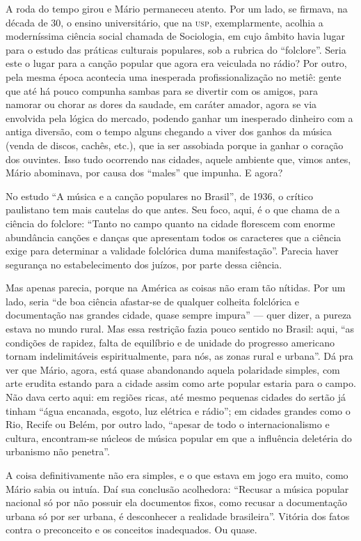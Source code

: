 A roda do tempo girou e Mário permaneceu atento. Por um lado, se
firmava, na década de 30, o ensino universitário, que na \textsc{usp},
exemplarmente, acolhia a moderníssima ciência social chamada de
Sociologia, em cujo âmbito havia lugar para o estudo das práticas
culturais populares, sob a rubrica do ``folclore''. Seria este o lugar
para a canção popular que agora era veiculada no rádio? Por outro, pela
mesma época acontecia uma inesperada profissionalização no metiê: gente
que até há pouco compunha sambas para se divertir com os amigos, para
namorar ou chorar as dores da saudade, em caráter amador, agora se via
envolvida pela lógica do mercado, podendo ganhar um inesperado dinheiro
com a antiga diversão, com o tempo alguns chegando a viver dos ganhos da
música (venda de discos, cachês, etc.), que ia ser assobiada porque ia
ganhar o coração dos ouvintes. Isso tudo ocorrendo nas cidades, aquele
ambiente que, vimos antes, Mário abominava, por causa dos ``males'' que
impunha. E agora?

No estudo ``A música e a canção populares no Brasil'', de 1936, o
crítico paulistano tem mais cautelas do que antes. Seu foco, aqui, é o
que chama de a ciência do folclore: ``Tanto no campo quanto na cidade
florescem com enorme abundância canções e danças que apresentam todos os
caracteres que a ciência exige para determinar a validade folclórica
duma manifestação''. Parecia haver segurança no estabelecimento dos
juízos, por parte dessa ciência.

Mas apenas parecia, porque na América as coisas não eram tão nítidas.
Por um lado, seria ``de boa ciência afastar-se de qualquer colheita
folclórica e documentação nas grandes cidade, quase sempre impura'' ---
quer dizer, a pureza estava no mundo rural. Mas essa restrição fazia
pouco sentido no Brasil: aqui, ``as condições de rapidez, falta de
equilíbrio e de unidade do progresso americano tornam indelimitáveis
espiritualmente, para nós, as zonas rural e urbana''. Dá pra ver que
Mário, agora, está quase abandonando aquela polaridade simples, com arte
erudita estando para a cidade assim como arte popular estaria para o
campo. Não dava certo aqui: em regiões ricas, até mesmo pequenas cidades
do sertão já tinham ``água encanada, esgoto, luz elétrica e rádio''; em
cidades grandes como o Rio, Recife ou Belém, por outro lado, ``apesar de
todo o internacionalismo e cultura, encontram-se núcleos de música
popular em que a influência deletéria do urbanismo não penetra''.

A coisa definitivamente não era simples, e o que estava em jogo era
muito, como Mário sabia ou intuía. Daí sua conclusão acolhedora:
``Recusar a música popular nacional só por não possuir ela documentos
fixos, como recusar a documentação urbana só por ser urbana, é
desconhecer a realidade brasileira''. Vitória dos fatos contra o
preconceito e os conceitos inadequados. Ou quase.

